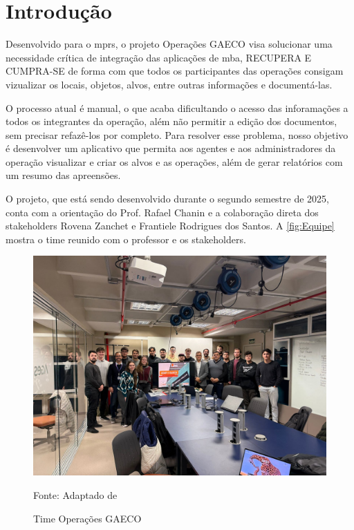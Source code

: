 \section[Introdução]{Introdução}
Desenvolvido para o \ac{mprs}, o projeto Operações GAECO visa solucionar uma necessidade crítica de integração das aplicações de \ac{mba}, RECUPERA E CUMPRA-SE de forma com que todos os participantes das operações consigam vizualizar os locais, objetos, alvos, entre outras informações e documentá-las.

O processo atual é manual, o que acaba dificultando o acesso das inforamações a todos os integrantes da operação, além não permitir a edição dos documentos, sem precisar refazê-los por completo. Para resolver esse problema, nosso objetivo é desenvolver um aplicativo que permita aos agentes e aos administradores da operação visualizar e criar os alvos e as operações, além de gerar relatórios com um resumo das apreensões.

O projeto, que está sendo desenvolvido durante o segundo semestre de 2025, conta com a orientação do Prof. Rafael Chanin e a colaboração direta dos stakeholders Rovena Zanchet e Frantiele Rodrigues dos Santos. A \autoref{fig:Equipe} mostra o time reunido com o professor e os stakeholders.

\begin{figure}[H]
    \centering
    \small
    \includegraphics[width=0.7\linewidth]{conteudo//2 - ages I//conteudo//figures//Equipe.jpeg}
    \caption{Time Operações GAECO}
    Fonte: Adaptado de \textcites{wiki-Operacoes GAECO}
    \label{fig:Equipe}
\end{figure}